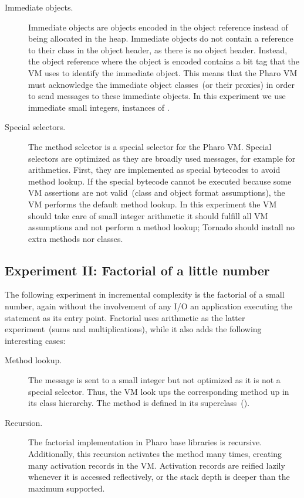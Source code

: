 \begin{description}
\item[Immediate objects.] Immediate objects are objects encoded in the object reference instead of being allocated in the heap. Immediate objects do not contain a reference to their class in the object header, as there is no object header. Instead, the object reference where the object is encoded contains a bit tag that the VM uses to identify the immediate object. This means that the Pharo VM must acknowledge the immediate object classes~(or their proxies) in order to send messages to these immediate objects. In this experiment we use immediate small integers, instances of .
\item[Special selectors.] The method selector \ct{+} is a special selector for the Pharo VM. Special selectors are optimized as they are broadly used messages, for example for arithmetics. First, they are implemented as special bytecodes to avoid method lookup. If the special bytecode cannot be executed because some VM assertions are not valid~(\eg class and object format assumptions), the VM performs the default method lookup. In this experiment the VM should take care of small integer arithmetic \ie it should fulfill all VM assumptions and not perform a method lookup; Tornado should install no extra methods nor classes.
\end{description}

\subsection{Experiment II: Factorial of a little number}

The following experiment in incremental complexity is the factorial of a small number, again without the involvement of any I/O \ie an application executing the  statement as its entry point. Factorial uses arithmetic as the latter experiment~(sums and multiplications), while it also adds the following interesting cases:

\begin{description}
\item[Method lookup.] The  message is sent to a small integer but not optimized as it is not a special selector. Thus, the VM look ups the corresponding method up in its class hierarchy. The method  is defined in its superclass~().
\item[Recursion.] The factorial implementation in Pharo base libraries is recursive. Additionally, this recursion activates the  method many times, creating many activation records in the VM. Activation records are reified lazily whenever it is accessed reflectively, or the stack depth is deeper than the maximum supported.
\end{description}


